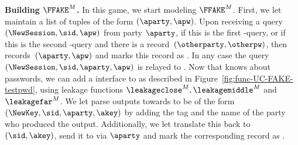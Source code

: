 \begin{games}
%   

\textbf{Building $\FFAKE^M$.} In this game, we start modeling $\FFAKE^M$.
First, we let \Func maintain a list of tuples of the form $(\aparty,\apw)$.
Upon receiving a query $(\NewSession,\sid,\apw)$ from party $\aparty$, if this is the first \NewSession-query, or if this is the second \NewSession-query and there is a record~$(\otherparty,\otherpw)$, then \Func records~$(\aparty,\apw)$ and marks this record  as . In any case the query $(\NewSession,\sid,\aparty,\apw)$ is relayed to \Sim. Now that \Func knows about passwords, we can add a \TestPwd interface to \Func as described in Figure~\ref{fig:func-UC-FAKE-testpwd}, using leakage functions $\leakageclose^M, \leakagemiddle^M$ and $\leakagefar^M$. We let \Sim parse outputs towards \Func to be of the form $(\NewKey,\sid,\aparty,\akey)$ by adding the \NewKey tag and the name of the party who produced the output. Additionally, we let \Func translate this back to $(\sid,\akey)$, send it to \Env via $\aparty$ and mark the corresponding record as .


\end{games}
